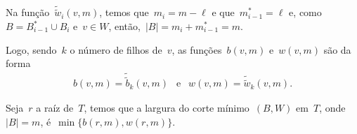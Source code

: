 \begin{itemize}
	Na função~$\tilde{\tilde{w}}_{i}(v,m)$, 
	temos que~${m_i = m-\ell}$ e que~${m_{i-1}^* = \ell}$
	e, como~${B = B_{i-1}^* \cup B_i}$ e~${v\in W}$, 
	então,~${|B| = m_i + m_{i-1}^*= m}$.

	\bigskip

	Logo, sendo~$k$ o número de filhos de~$v$,
	as funções~$b(v,m)$ e~$w(v,m)$ são da forma
	\begin{align*}
		b(v,m) = \tilde{\tilde{b}}_k(v,m)\ \ \text{ e }\ \
		w(v,m) = \tilde{\tilde{w}}_k(v,m). \nonumber
	\end{align*}
	
	Seja~$r$ a raíz de~$T$, temos que
	a largura do corte mínimo~$(B,W)$ em~$T$, onde~${|B|=m}$, 
	é~$\min\{b(r,m), w(r,m)\}$.
\end{itemize}